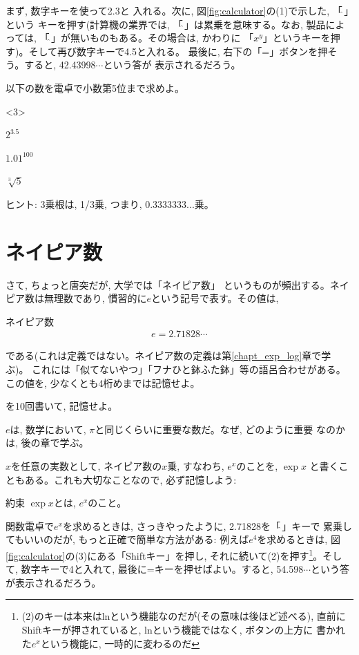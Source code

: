 まず, 数字キーを使って2.3と
入れる。次に, 図\ref{fig:calculator}の(1)で示した, 「$\hat{\,}$」という
キーを押す(計算機の業界では, 「$\hat{\,}$」は累乗を意味する。なお, 
製品によっては, 「$\hat{\,}$」が無いものもある。その場合は, かわりに
「$x^y$」というキーを押す)。そして再び数字キーで4.5と入れる。
最後に, 右下の「=」ボタンを押そう。すると, 42.43998$\cdots$という答が
表示されるだろう。

\begin{q}\label{q:alg_dentaku2} 
以下の数を電卓で小数第5位まで求めよ。
\begin{edaenumerate}<3>
\item $2^{3.5}$
\item $1.01^{100}$
\item $\sqrt[3]{5}$
\end{edaenumerate}
ヒント: 3乗根は, 1/3乗, つまり, 0.3333333...乗。
\end{q}
\mv

\section{ネイピア数}

さて, ちょっと唐突だが, 大学では「ネイピア数」
というものが頻出する。ネイピア数は無理数であり, 慣習的に$e$という記号で表す。その値は,  
\begin{itembox}{ネイピア数}
\begin{eqnarray}
e=2.71828\cdots\label{eq:NapierNum_value}
\end{eqnarray}
\end{itembox}
である(これは定義ではない。ネイピア数の定義は第\ref{chapt_exp_log}章で学ぶ)。
これには「似てないやつ」「フナひと鉢ふた鉢」等の語呂合わせがある。
この値を, 少なくとも4桁めまでは記憶せよ。\hv

\begin{q}\label{q:Napier_value_memorize} 
を10回書いて, 記憶せよ。\end{q}

$e$は, 数学において, $\pi$と同じくらいに重要な数だ。なぜ, どのように重要
なのかは, 後の章で学ぶ。

$x$を任意の実数として, ネイピア数の$x$乗, すなわち, $e^x$のことを, $\exp x$
と書くこともある。これも大切なことなので, 必ず記憶しよう:
\begin{itembox}{約束}
$\exp x$とは, $e^x$のこと。
\end{itembox}

関数電卓で$e^x$を求めるときは, さっきやったように, 2.71828を「$\hat{\,}$」キーで
累乗してもいいのだが, もっと正確で簡単な方法がある: 
例えば$e^4$を求めるときは, 図\ref{fig:calculator}の(3)にある「Shiftキー」を押し, 
それに続いて(2)を押す\footnote{(2)のキーは本来はlnという機能なのだが(その意味は後ほど述べる), 
直前にShiftキーが押されていると, lnという機能ではなく, ボタンの上方に
書かれた$e^x$という機能に, 一時的に変わるのだ}。そして, 数字キーで4と入れて, 
最後に=キーを押せばよい。すると, 54.598$\cdots$という答が表示されるだろう。

